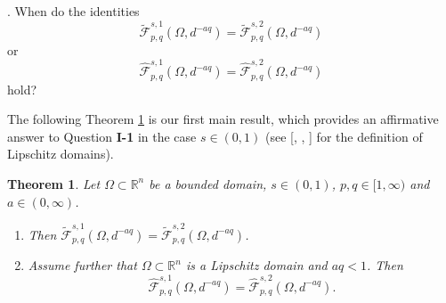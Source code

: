\documentclass[11pt,twoside]{article}
\def\boz{{\Omega}}
\newtheorem{theorem}{Theorem}[section]
\theoremstyle{mylem}
\theoremstyle{definition}
\numberwithin{equation}{section}
\begin{document}
\medskip 

{. 
When do the identities
\[
\widetilde{\mathcal{F}}_{p,q}^{s,1}(\boz,d^{-aq}) =\widetilde{\mathcal{F}}_{p,q}^{s,2}(\boz,d^{-aq})
\]
or
\[
\widehat{\mathcal{F}}_{p,q}^{s,1}(\boz,d^{-aq})= \widehat{\mathcal{F}}_{p,q}^{s,2}(\boz,d^{-aq})
\]
hold?}	


\medskip

The following Theorem \ref{thm-main} is our first main result, which 
provides an affirmative answer to Question {\bf I-1} in the case $s\in (0,1)$ (see [\cite{a2015}, \cite{pt2015}, 
\cite{s1970}] for the definition of Lipschitz domains).

\begin{theorem}\label{thm-main} 
Let \(\Omega\subset\mathbb{R}^n\) be a bounded domain, 
$s\in (0, 1)$, $p,q\in[1,\infty)$ and $a\in(0,\infty)$.
\begin{enumerate}
\item[\rm(i)]
Then $\widetilde{\mathcal{F}}_{p,q}^{s,1}(\boz,d^{-aq}) =\widetilde{\mathcal{F}}_{p,q}^{s,2}(\boz,d^{-aq})$.
\item[\rm(ii)]
Assume further that \(\Omega\subset\mathbb{R}^n\) is a Lipschitz domain and
$aq<1$. Then $$\widehat{\mathcal{F}}_{p,q}^{s,1}(\boz,d^{-aq})= \widehat{\mathcal{F}}_{p,q}^{s,2}(\boz,d^{-aq}).$$
\end{enumerate}
\end{theorem}
\end{document}
